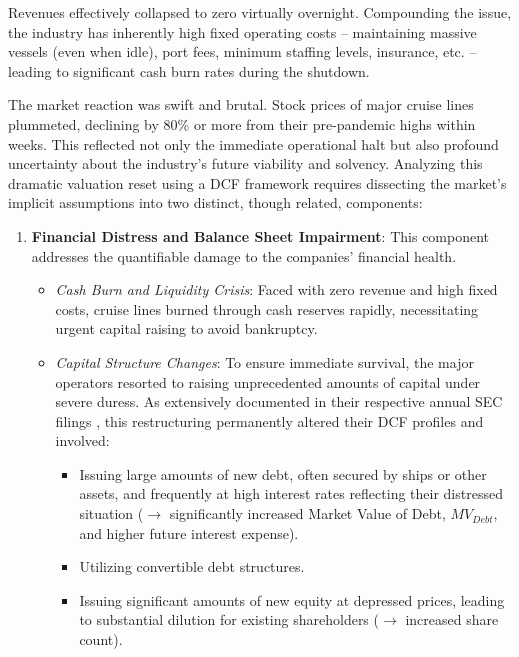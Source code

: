Revenues effectively collapsed to zero virtually overnight. Compounding the issue, the industry has inherently high fixed operating costs – maintaining massive vessels (even when idle), port fees, minimum staffing levels, insurance, etc. – leading to significant cash burn rates during the shutdown.

The market reaction was swift and brutal. Stock prices of major cruise lines plummeted, declining by 80\% or more from their pre-pandemic highs within weeks. This reflected not only the immediate operational halt but also profound uncertainty about the industry's future viability and solvency. Analyzing this dramatic valuation reset using a DCF framework requires dissecting the market's implicit assumptions into two distinct, though related, components:

\begin{enumerate}
    \item \textbf{Financial Distress and Balance Sheet Impairment}: This component addresses the quantifiable damage to the companies' financial health.
          \begin{itemize}
              \item \textit{Cash Burn and Liquidity Crisis}: Faced with zero revenue and high fixed costs, cruise lines burned through cash reserves rapidly, necessitating urgent capital raising to avoid bankruptcy.
              \item \textit{Capital Structure Changes}: To ensure immediate survival, the major operators resorted to raising unprecedented amounts of capital under severe duress. As extensively documented in their respective annual SEC filings \parencite{carnival202110k, rcl202110k, nclh202110k}, this restructuring permanently altered their DCF profiles and involved:
                    \begin{itemize}
                        \item Issuing large amounts of new debt, often secured by ships or other assets, and frequently at high interest rates reflecting their distressed situation (\(\rightarrow\) significantly increased Market Value of Debt, \(MV_{Debt}\), and higher future interest expense).
                        \item Utilizing convertible debt structures.
                        \item Issuing significant amounts of new equity at depressed prices, leading to substantial dilution for existing shareholders (\(\rightarrow\) increased share count).
                    \end{itemize}

\end{itemize}
\end{enumerate}
